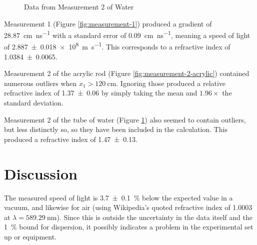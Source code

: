 \documentclass[a4paper]{scrartcl}
\begin{document}
\begin{figure}
    \centering
    \caption{Data from Measurement 2 of Water}
    \label{fig:measurement-2-water}
\end{figure}

Measurement 1 (Figure \ref{fig:measurement-1}) produced a gradient of \SI{28.87}{\centi\metre\per\nano\second} with a standard error of \SI{0.09}{\centi\metre\per\nano\second}, meaning a speed of light of \SI{2.887 \pm 0.018e8}{\metre\per\second}. This corresponds to a refractive index of \SI{1.0384 \pm 0.0065}{}.

Measurement 2 of the acrylic rod (Figure \ref{fig:measurement-2-acrylic}) contained numerous outliers when \(x_1 > \SI{120}{\centi\metre}\). Ignoring those produced a relative refractive index of \SI{1.37 \pm 0.06}{} by simply taking the mean and \(1.96 \times\) the standard deviation.

Measurement 2 of the tube of water (Figure \ref{fig:measurement-2-water}) also seemed to contain outliers, but less distinctly so, so they have been included in the calculation. This produced a refractive index of \SI{1.47 \pm 0.13}{}.

\section{Discussion}
The measured speed of light is \SI{3.7 \pm 0.1}{\percent} below the expected value in a vacuum, and likewise for air (using Wikipedia's quoted refractive index of \SI{1.0003}{} at \(\lambda = \SI{589.29}{\nano\metre}\)). Since this is outside the uncertainty in the data itself and the \SI{1}{\percent} bound for dispersion, it possibly indicates a problem in the experimental set up or equipment.
\end{document}
